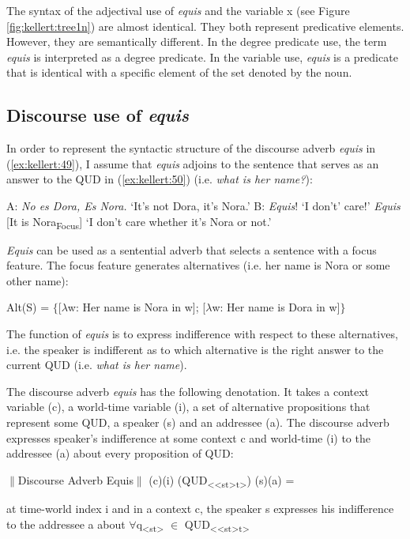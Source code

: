 \documentclass[output=paper]{langsci/langscibook}
\begin{document}
The syntax of the adjectival use of \textit{equis} and the variable x (see Figure \ref{fig:kellert:tree1n}) are almost identical. They both represent predicative elements. However, they are semantically different. In the degree predicate use, the term \textit{equis} is interpreted as a degree predicate. In the variable use, \textit{equis} is a predicate that is identical with a specific element of the set denoted by the noun.


\subsection{Discourse use of \textit{equis}}\label{sec:kellert:3.4}
In order to represent the syntactic structure of the discourse adverb \textit{equis} in (\ref{ex:kellert:49}), I assume that \textit{equis} adjoins to the sentence that serves as an answer to the QUD in (\ref{ex:kellert:50}) (i.e. \textit{what is her name?}):

\ea\label{ex:kellert:49} A: \textit{No es Dora, Es Nora.} `It’s not Dora, it’s Nora.' B: \textit{Equis}! ‘I don’t’ care!’
\ex\label{ex:kellert:50}  \textit{Equis} {[}It is Nora\textsubscript{Focus}{]} ‘I don’t care whether it’s Nora or not.’
\z

\textit{Equis} can be used as a sentential adverb that selects a sentence with a focus feature. The focus feature generates alternatives (i.e. her name is Nora or some other name):

\ea\label{ex:kellert:51} Alt(S) = $\lbrace${[}$\lambda$w: Her name is Nora in w{]}; {[}$\lambda$w: Her name is Dora in w{]}$\rbrace$
\z

The function of \textit{equis} is to express indifference with respect to these alternatives, i.e. the speaker is indifferent as to which alternative is the right answer to the current QUD (i.e. \textit{what is her name}).

The discourse adverb \textit{equis} has the following denotation. It takes a context variable (c), a world-time variable (i), a set of alternative propositions that represent some QUD, a speaker (s) and an addressee (a). The discourse adverb expresses speaker’s indifference at some context c and world-time (i) to the addressee (a) about every proposition of QUD:

\ea\label{ex:kellert:52} $\parallel$Discourse Adverb Equis$\parallel$ (c)(i) (QUD\textsubscript{{<}{<}st>t>}) (s)(a) =\par at time-world index i and in a context c, the speaker s expresses his indifference to the addressee a about $\forall$q\textsubscript{<st>} $\in$ QUD\textsubscript{{<}{<}st>t>}
\z
\end{document}
